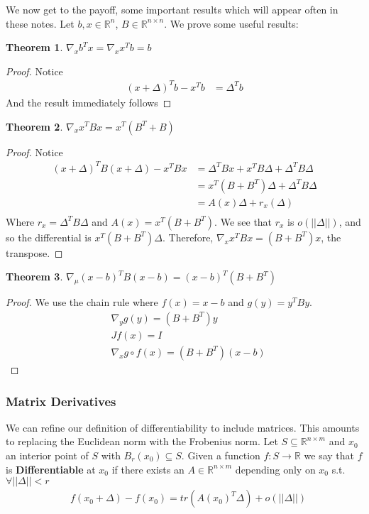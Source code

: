 \documentclass[]{article}
\theoremstyle{mattstyle}
\newtheorem{theorem}{Theorem}[section]
\theoremstyle{definition}
\begin{document}
We now get to the payoff, some important results which will appear often in these notes. Let $b,x \in \mathbb{R}^n$, $B \in \mathbb{R}^{n \times n}$. We prove some useful results:

\begin{theorem}
	$\nabla_{x} b^Tx = \nabla_{x} x^Tb= b$
\end{theorem}
\begin{proof}
	Notice 
	\begin{align*}
	(x+\Delta)^Tb - x^Tb &= \Delta^Tb
	\end{align*}
	And the result immediately follows
\end{proof}

\begin{theorem}
	$\nabla_{x} x^TBx = x^T(B^T+B)$
\end{theorem}
\begin{proof}
	Notice 
	\begin{align*}
	(x+\Delta)^TB(x+\Delta) - x^TBx &= \Delta^TBx + x^TB\Delta + \Delta^TB\Delta\\
	&= x^T(B + B^T)\Delta + \Delta^TB\Delta\\
	&= A(x)\Delta + r_{x}(\Delta)\\
	\end{align*}
	Where $r_{x}=\Delta^TB\Delta$ and $A(x)=x^T(B + B^T)$. We see that $r_{x}$ is $o(||\Delta||)$, and so the differential is $x^T(B + B^T)\Delta$. Therefore, $\nabla_x x^TBx = (B + B^T)x$, the transpose.
\end{proof}

\begin{theorem}
	$\nabla_{\mu} (x-b)^TB(x-b) = (x-b)^T(B+B^T)$
\end{theorem}
\begin{proof}
	We use the chain rule where $f(x)=x-b$ and $g(y)=y^TBy$.
	\begin{align*}
	&\nabla_{y}g(y) = (B + B^T)y\\
	&Jf(x) = I \\
	&\nabla_{x} g \circ f(x) = (B + B^T)(x-b)
	\end{align*}
\end{proof}

\subsubsection{Matrix Derivatives}
We can refine our definition of differentiability to include matrices. This amounts to replacing the Euclidean norm with the Frobenius norm. Let $S \subseteq \mathbb{R}^{n \times m}$ and $x_0$ an interior point of $S$ with $B_r(x_0) \subseteq S$. Given a function $f: S \rightarrow \mathbb{R}$ we say that $f$ is \textbf{Differentiable} at $x_0$ if there exists an $A \in \mathbb{R}^{n \times m}$ depending only on $x_0$ s.t. $\forall ||\Delta|| < r$
\begin{align*}
&f(x_0 + \Delta) - f(x_0) = tr(A(x_0)^T\Delta) + o(||\Delta||)
\end{align*}
\end{document}
